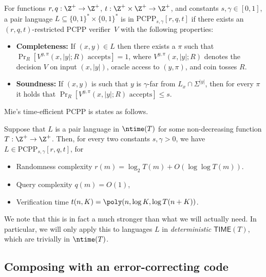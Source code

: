 \begin{definition}
For functions $r, q:\Z^+ \rightarrow \Z^+$, $t:\Z^+\times \Z^+ \rightarrow \Z^+$,
and constants
$s, \gamma \in  [0, 1]$,
a pair language $L \subseteq \{0, 1\}^* \times \{0, 1\}^*$ is in $\mathrm{PCPP}_{s, \gamma}[r, q, t]$
if there exists an $(r, q, t)$-restricted PCPP verifier~$V$ with the following properties:
\begin{itemize}
\item[$\circ$] \textbf{Completeness:} If $(x, y) \in L$ then there exists a $\pi$ such that $\Pr_R[\text{$V^{y, \pi}(x, |y|; R)$ accepts}] = 1$,
	where $V^{y, \pi}(x, |y|; R)$ denotes the decision $V$ on input $(x, |y|)$,
	oracle access to $(y, \pi)$, and coin tosses $R$.
\item[$\circ$] \textbf{Soundness:} If $(x, y)$ is such that $y$ is $\gamma$-far from $L_x \cap \Sigma^{|y|}$,
	then for every $\pi$ it holds that $\Pr_R[\text{$V^{y, \pi}(x, |y|;R)$ accepts}] \leq s$.
\end{itemize}
\end{definition}

Mie's time-efficient PCPP is states as follows.

\begin{theorem}\label{thm:pcpp-mie}
Suppose that $L$ is a pair language in $\ntime(T)$
for some non-decreasing function $T : \Z^+ \rightarrow \Z^+$.
Then, for every two constants $s, \gamma >0$,
we have $L \in \mathrm{PCPP}_{s, \gamma}[r, q, t]$, for
\begin{itemize}
\item[$\circ$] Randomness complexity $r(m) = \log_2 T(m) + O(\log\log T(m))$.
\item[$\circ$] Query complexity $q(m) = O(1)$,
\item[$\circ$] Verification time $t(n, K) = \poly(n, \log K, \log T(n + K))$.
\end{itemize}
\end{theorem}

We note that this is in fact a much stronger than what we will actually need.
In particular, we will only apply this to languages $L$ in \emph{deterministic} $\mathsf{TIME}(T)$,
which are trivially in $\ntime(T)$.

\subsection{Composing with an error-correcting code}\label{sec:composing-with-an-error-correcting-code}

